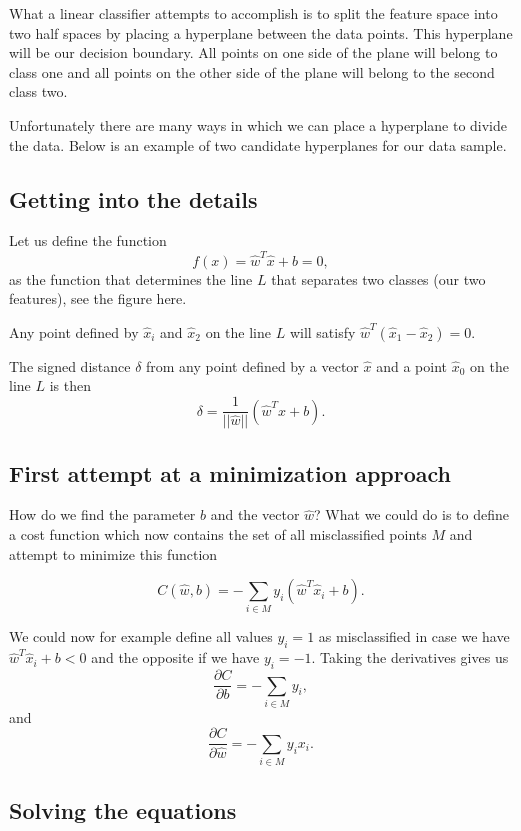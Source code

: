 \documentclass[%
oneside,                 %
final,                   %
10pt]{article}
\begin{document}
What a linear classifier attempts to accomplish is to split the
feature space into two half spaces by placing a hyperplane between the
data points.  This hyperplane will be our decision boundary.  All
points on one side of the plane will belong to class one and all points
on the other side of the plane will belong to the second class two.

Unfortunately there are many ways in which we can place a hyperplane
to divide the data.  Below is an example of two candidate hyperplanes
for our data sample.

\subsection{Getting into the details}

Let us define the function
\[
f(x) = \hat{w}^T\hat{x}+b = 0,
\]
as the function that determines the line $L$ that separates two classes (our two features), see the figure here. 


Any point defined by $\hat{x}_i$ and $\hat{x}_2$ on the line $L$ will satisfy $\hat{w}^T(\hat{x}_1-\hat{x}_2)=0$. 

The signed distance $\delta$ from any point defined by a vector $\hat{x}$ and a point $\hat{x}_0$ on the line $L$ is then
\[
\delta = \frac{1}{\vert\vert \hat{w}\vert\vert}(\hat{w}^T\hat{x}+b).
\]

\subsection{First attempt at a minimization approach}

How do we find the parameter $b$ and the vector $\hat{w}$? What we could
do is to define a cost function which now contains the set of all
misclassified points $M$ and attempt to minimize this function

\[
C(\hat{w},b) = -\sum_{i\in M} y_i(\hat{w}^T\hat{x}_i+b).
\]

We could now for example define all values $y_i =1$ as misclassified in case we have $\hat{w}^T\hat{x}_i+b < 0$ and the opposite if we have $y_i=-1$. Taking the derivatives gives us
\[
\frac{\partial C}{\partial b} = -\sum_{i\in M} y_i,
\]
and 
\[
\frac{\partial C}{\partial \hat{w}} = -\sum_{i\in M} y_ix_i.
\]

\subsection{Solving the equations}
\end{document}
